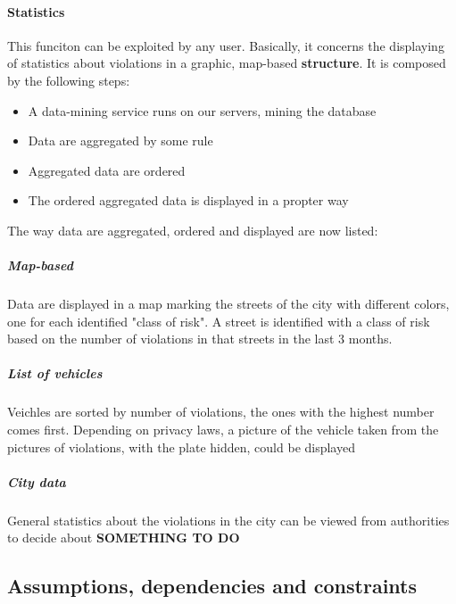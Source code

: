 \documentclass{article}
\begin{document}
		\paragraph{Statistics}
			This funciton can be exploited by any user. Basically, it concerns the displaying of statistics about violations in a graphic, map-based \textbf{structure}. It is composed by the following steps:
			\begin{itemize}
				\item A data-mining service runs on our servers, mining the database
				\item Data are aggregated by some rule
				\item Aggregated data are ordered
				\item The ordered aggregated data is displayed in a propter way
			\end{itemize}
			The way data are aggregated, ordered and displayed are now listed:
				\subparagraph{Map-based} Data are displayed in a map marking the streets of the city with different colors, one for each identified "class of risk". A street is identified with a class of risk based on the number of violations in that streets in the last 3 months.
				\subparagraph{List of vehicles} Veichles are sorted by number of violations, the ones with the highest number comes first. Depending on privacy laws, a picture of the vehicle taken from the pictures of violations, with the plate hidden, could be displayed
				\subparagraph{City data} General statistics about the violations in the city can be viewed from authorities to decide about \textbf{SOMETHING TO DO}
			
	
	\subsection{Assumptions, dependencies and constraints}
	
\end{document}
